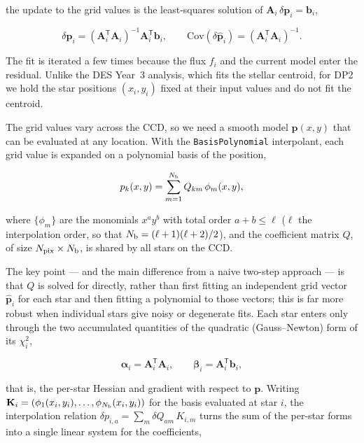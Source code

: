 the update to the grid values is the least-squares solution of
$\mathbf{A}_i\,\delta\mathbf{p}_i = \mathbf{b}_i$,

\begin{equation}
    \delta\hat{\mathbf{p}}_i =
        \left(\mathbf{A}_i^{\mathsf T}\mathbf{A}_i\right)^{-1}
        \mathbf{A}_i^{\mathsf T}\mathbf{b}_i,
    \qquad
    \mathrm{Cov}(\delta\hat{\mathbf{p}}_i) =
        \left(\mathbf{A}_i^{\mathsf T}\mathbf{A}_i\right)^{-1}.
    \label{eq:lsq_star}
\end{equation}

The fit is iterated a few times because the flux $f_i$ and the current model
enter the residual. Unlike the DES Year~3 analysis, which fits the stellar
centroid, for DP2 we hold the star positions $(x_i,y_i)$ fixed at their input
values and do not fit the centroid.

The grid values vary across the CCD, so we need a smooth model $\mathbf{p}(x,y)$
that can be evaluated at any location. With the \texttt{BasisPolynomial}
interpolant, each grid value is expanded on a polynomial basis of the position,

\begin{equation}
    p_{k}(x,y) = \sum_{m=1}^{N_{\rm b}} Q_{km}\, \phi_m(x,y),
    \label{eq:basispoly}
\end{equation}

where $\{\phi_m\}$ are the monomials $x^a y^b$ with total order $a+b\leq\ell$
($\ell$ the interpolation order, so that $N_{\rm b}=(\ell+1)(\ell+2)/2$), and the
coefficient matrix $Q$, of size $N_{\rm pix}\times N_{\rm b}$, is shared by all
stars on the CCD.

The key point --- and the main difference from a naive two-step approach --- is
that $Q$ is solved for directly, rather than first fitting an independent grid
vector $\hat{\mathbf{p}}_i$ for each star and then fitting a polynomial to those
vectors; this is far more robust when individual stars give noisy or degenerate
fits. Each star enters only through the two accumulated quantities of the
quadratic (Gauss--Newton) form of its $\chi_i^2$,

\begin{equation}
    \boldsymbol{\alpha}_i = \mathbf{A}_i^{\mathsf T}\mathbf{A}_i,
    \qquad
    \boldsymbol{\beta}_i = \mathbf{A}_i^{\mathsf T}\mathbf{b}_i,
    \label{eq:alpha_beta}
\end{equation}

that is, the per-star Hessian and gradient with respect to $\mathbf{p}$. Writing
$\mathbf{K}_i = \left(\phi_1(x_i,y_i),\dots,\phi_{N_{\rm b}}(x_i,y_i)\right)$ for
the basis evaluated at star $i$, the interpolation relation
$\delta p_{i,a} = \sum_m \delta Q_{am}\, K_{i,m}$ turns the sum of the per-star
forms into a single linear system for the coefficients,

